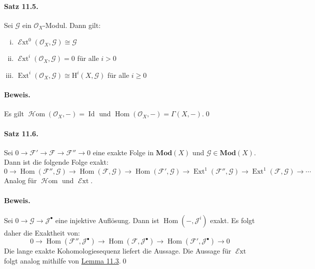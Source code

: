\paragraph{Satz 11.5.}\label{11.5} Sei $\mathcal{G}$ ein $\mathcal{O}_X$-Modul. Dann gilt:
\begin{enumerate}[(i)]
\item $\operatorname{\mathcal{E}xt}^0(\mathcal{O}_X,\mathcal{G})\cong\mathcal{G}$
\item $\operatorname{\mathcal{E}xt}^i(\mathcal{O}_X,\mathcal{G})=0$ für alle $i>0$
\item $\operatorname{Ext}^i(\mathcal{O}_X,\mathcal{G}) \cong\mathrm{H}^i(X,\mathcal{G})$ für alle $i\geq 0$
\end{enumerate}

\paragraph{Beweis.} Es gilt $\operatorname{\mathcal{H}om}(\mathcal{O}_X,-) = \operatorname{Id}$ und $\operatorname{Hom}(\mathcal{O}_X,-)=\Gamma(X,-)$.\qed

\paragraph{Satz 11.6.}\label{11.6} Sei $0\to\mathcal{F}'\to\mathcal{F}\to\mathcal{F}''\to 0$ eine exakte Folge in $\mathbf{Mod}(X)$ und $\mathcal{G}\in\mathbf{Mod}(X)$. Dann ist die folgende Folge exakt:
\[0\to\operatorname{Hom}(\mathcal{F}'',\mathcal{G})\to\operatorname{Hom}(\mathcal{F},\mathcal{G})\to\operatorname{Hom}(\mathcal{F}',\mathcal{G})\to\operatorname{Ext}^1(\mathcal{F}'',\mathcal{G})\to\operatorname{Ext}^1(\mathcal{F},\mathcal{G})\to\cdots\]
Analog für $\operatorname{\mathcal{H}om}$ und $\operatorname{\mathcal{E}xt}$.

\paragraph{Beweis.} Sei $0\to\mathcal{G}\to\mathcal{J}^\bullet$ eine injektive Auflösung. Dann ist $\operatorname{Hom}(-,\mathcal{J}^i)$ exakt. Es folgt daher die Exaktheit von:
\[0\longrightarrow\operatorname{Hom}(\mathcal{F}'',\mathcal{J}^\bullet)\longrightarrow\operatorname{Hom}(\mathcal{F},\mathcal{J}^\bullet)\longrightarrow\operatorname{Hom}(\mathcal{F}',\mathcal{J}^\bullet)\longrightarrow 0\]
Die lange exakte Kohomologiesequenz liefert die Aussage. Die Aussage für $\operatorname{\mathcal{E}xt}$ folgt analog mithilfe von \hyperref[11.3]{Lemma 11.3}.\qed

